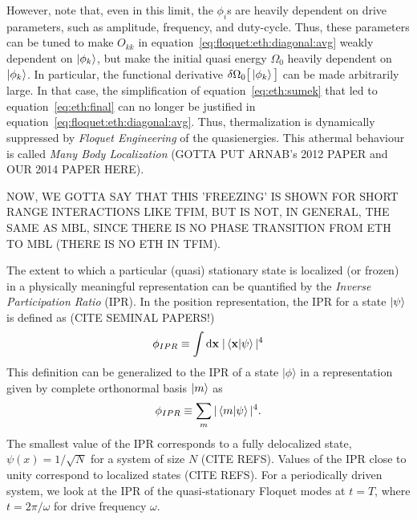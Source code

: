 \documentclass[%
 reprint,
superscriptaddress,
 amsmath,amssymb,
 aps,
prb,
]{revtex4-2}
\begin{document}
However, note that, even in this limit, the $\phi_i$s are heavily dependent on drive parameters, such as amplitude, frequency, and duty-cycle. Thus, these parameters can be tuned to  make $O_{kk}$ in equation~\ref{eq:floquet:eth:diagonal:avg} weakly dependent on $\ket{\phi_k}$, but make the initial quasi energy $\Omega_0$ heavily dependent on $\ket{\phi_k}$. In particular, the functional derivative $\var{\Omega_0\big[\ket{\phi_k}\big]}$ can be made arbitrarily large. In that case, the simplification of equation~\ref{eq:eth:sumek} that led to equation~\ref{eq:eth:final} can no longer be justified in equation~\ref{eq:floquet:eth:diagonal:avg}. Thus, thermalization is dynamically suppressed by \textit{Floquet Engineering} of the quasienergies. This athermal behaviour is called \textit{Many Body Localization} (GOTTA PUT ARNAB's 2012 PAPER and OUR 2014 PAPER HERE). 


NOW, WE GOTTA SAY THAT THIS 'FREEZING' IS SHOWN FOR SHORT RANGE INTERACTIONS LIKE TFIM, BUT IS NOT, IN GENERAL, THE SAME AS MBL, SINCE THERE IS NO PHASE TRANSITION FROM ETH TO MBL (THERE IS NO ETH IN TFIM).

The extent to which a particular (quasi) stationary state is localized (or frozen) in a physically meaningful representation can be quantified by the \emph{Inverse Participation Ratio} (IPR). In the position representation, the IPR for a state $\ket{\psi}$ is defined as (CITE SEMINAL PAPERS!)
\begin{equation*}
	\phi_{IPR}\equiv \int \mathrm{d}\mathbf{x}\;\vert\ip{\mathbf{x}}{\psi}\vert^4
\end{equation*}
This definition can be generalized to the IPR of a state $|\phi\rangle$ in a representation given by complete orthonormal basis $\ket{m}$ as 
\begin{equation}
\label{eq:ipr:defn}
\phi_{IPR} \equiv \sum_m\vert\ip{m}{\psi}\vert^4.
\end{equation}
The smallest value of the IPR corresponds to a fully delocalized state, $\psi(x)=1/\sqrt{N}$ for a system of size $N$ (CITE REFS). Values of the IPR close to unity correspond to localized states (CITE REFS). For a periodically driven system, we look at the IPR of the quasi-stationary Floquet modes at $t=T$, where $t=2\pi/\omega$ for drive frequency $\omega$.
\end{document}
